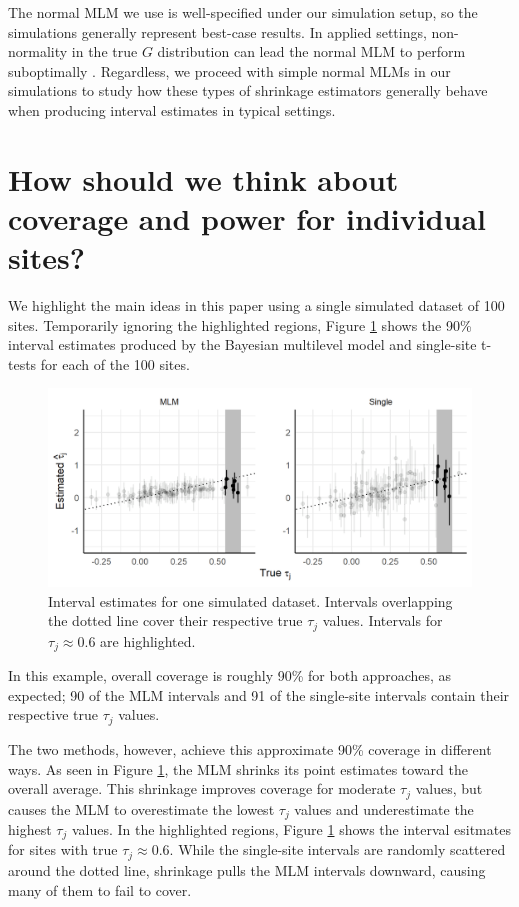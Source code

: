 \documentclass[]{article}
\begin{document}
The normal MLM we use is well-specified under our simulation setup, so the simulations generally represent best-case results.
In applied settings, non-normality in the true $G$ distribution can lead the normal MLM to perform suboptimally \citep{armstrong2020robust}.
Regardless, we proceed with simple normal MLMs in our simulations to study how these types of shrinkage estimators generally behave when producing interval estimates in typical settings.


\section{How should we think about coverage and power for individual sites?}

We highlight the main ideas in this paper using a single simulated dataset of 100 sites.
Temporarily ignoring the highlighted regions, Figure \ref{fig:shrinkageplot_slice1} shows the 90\% interval estimates produced by the Bayesian multilevel model and single-site t-tests for each of the 100 sites.
\begin{figure}[t]
	\centering
	\includegraphics[width=\textwidth]{shrinkageplot_slice1}
	\caption{Interval estimates for one simulated dataset. Intervals overlapping the dotted line cover their respective true $\tau_j$ values. Intervals for $\tau_j \approx 0.6$ are highlighted.}
	\label{fig:shrinkageplot_slice1}
\end{figure}
In this example, overall coverage is roughly 90\% for both approaches, as expected; 90 of the MLM intervals and 91 of the single-site intervals contain their respective true $\tau_j$ values.

The two methods, however, achieve this approximate 90\% coverage in different ways.
As seen in Figure \ref{fig:shrinkageplot_slice1}, the MLM shrinks its point estimates toward the overall average.
This shrinkage improves coverage for moderate $\tau_j$ values, but causes the MLM to overestimate the lowest $\tau_j$ values and underestimate the highest $\tau_j$ values.
In the highlighted regions, Figure \ref{fig:shrinkageplot_slice1} shows the interval esitmates for sites with true $\tau_j \approx 0.6$.
While the single-site intervals are randomly scattered around the dotted line, shrinkage pulls the MLM intervals downward, causing many of them to fail to cover.
\end{document}
